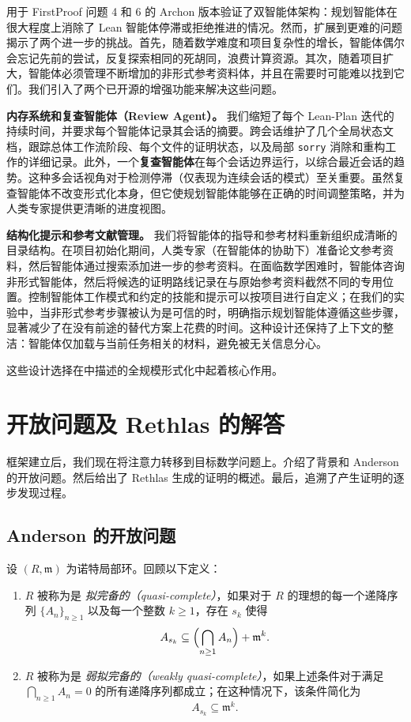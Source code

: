 用于 FirstProof 问题 4 和 6 的 Archon 版本验证了双智能体架构：规划智能体在很大程度上消除了 Lean 智能体停滞或拒绝推进的情况。然而，扩展到更难的问题揭示了两个进一步的挑战。首先，随着数学难度和项目复杂性的增长，智能体偶尔会忘记先前的尝试，反复探索相同的死胡同，浪费计算资源。其次，随着项目扩大，智能体必须管理不断增加的非形式参考资料体，并且在需要时可能难以找到它们。我们引入了两个已开源的增强功能来解决这些问题。

\textbf{内存系统和复查智能体（Review Agent）。} 我们缩短了每个 Lean-Plan 迭代的持续时间，并要求每个智能体记录其会话的摘要。跨会话维护了几个全局状态文档，跟踪总体工作流阶段、每个文件的证明状态，以及局部 \texttt{sorry} 消除和重构工作的详细记录。此外，一个\textbf{复查智能体}在每个会话边界运行，以综合最近会话的趋势。这种多会话视角对于检测停滞（仅表现为连续会话的模式）至关重要。虽然复查智能体不改变形式化本身，但它使规划智能体能够在正确的时间调整策略，并为人类专家提供更清晰的进度视图。

\textbf{结构化提示和参考文献管理。} 我们将智能体的指导和参考材料重新组织成清晰的目录结构。在项目初始化期间，人类专家（在智能体的协助下）准备论文参考资料，然后智能体通过搜索添加进一步的参考资料。在面临数学困难时，智能体咨询非形式智能体，然后将候选的证明路线记录在与原始参考资料截然不同的专用位置。控制智能体工作模式和约定的技能和提示可以按项目进行自定义；在我们的实验中，当非形式参考步骤被认为是可信的时，明确指示规划智能体遵循这些步骤，显著减少了在没有前途的替代方案上花费的时间。这种设计还保持了上下文的整洁：智能体仅加载与当前任务相关的材料，避免被无关信息分心。

\medskip
\noindent 这些设计选择在中描述的全规模形式化中起着核心作用。

\section{开放问题及 Rethlas 的解答}\label{sec:rethlas_results}

框架建立后，我们现在将注意力转移到目标数学问题上。介绍了背景和 Anderson 的开放问题。然后给出了 Rethlas 生成的证明的概述。最后，追溯了产生证明的逐步发现过程。

\subsection{Anderson 的开放问题}\label{subsec:open_problem}


设 \((R, \mathfrak{m})\) 为诺特局部环。回顾以下定义：
\begin{enumerate}[leftmargin=*]
    \item $R$ 被称为是 \emph{拟完备的（quasi-complete）}，如果对于 $R$ 的理想的每一个递降序列 $\{A_n\}_{n\ge 1}$ 以及每一个整数 \(k \ge 1\)，存在 \(s_k\) 使得
    \[
    A_{s_k} \subseteq \Bigl(\bigcap_{n\ge 1} A_n\Bigr) + \mathfrak{m}^k.
    \]

    \item $R$ 被称为是 \emph{弱拟完备的（weakly quasi-complete）}，如果上述条件对于满足 \(\bigcap_{n \ge 1} A_n = 0\) 的所有递降序列都成立；在这种情况下，该条件简化为
  \[
  A_{s_k} \subseteq \mathfrak{m}^k.
  \]
\end{enumerate}

